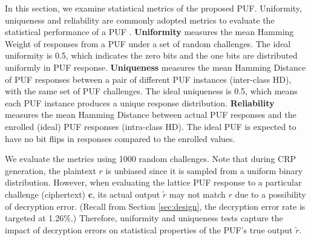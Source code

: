 

In this section, we examine statistical metrics of the proposed PUF. 
Uniformity, uniqueness and reliability are commonly adopted metrics to evaluate the statistical performance of a PUF \cite{maiti2013systematic}. 
\textbf{Uniformity} measures the mean Hamming Weight of responses from a PUF under a set of random challenges. 
The ideal uniformity is 0.5, which indicates the zero bits and the one bits are distributed uniformly in PUF response. 
\textbf{Uniqueness} measures the mean Hamming Distance of PUF responses between a pair of different PUF instances (inter-class HD), with the same set of PUF challenges. 
The ideal uniqueness is 0.5, which means each PUF instance produces a unique response distribution. \textbf{Reliability} measures the mean Hamming Distance between actual PUF responses and the enrolled (ideal) PUF responses (intra-class HD). 
The ideal PUF is expected to have no bit flips in responses compared to the enrolled values.

We evaluate the metrics %
using 1000 random challenges.
Note that during CRP generation, the plaintext $r$ is unbiased since it is sampled from a uniform binary distribution. 
However, when evaluating the lattice PUF response to a particular challenge (ciphertext) $\mathbf{c}$, its actual output $\tilde{r}$ may not match $r$ due to a possibility of decryption error. (Recall from Section \ref{sec:design}, the decryption error rate is targeted at 1.26\%.) 
Therefore, uniformity and uniqueness tests capture the impact of decryption errors on statistical properties of the PUF's true output $\tilde{r}$.

